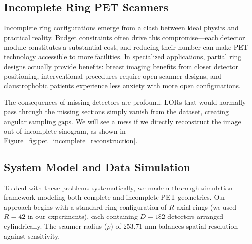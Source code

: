 \documentclass[
reprint,
superscriptaddress,
nofootinbib,
amsmath,amssymb,
aps,
prd,
]{revtex4-2}
\begin{document}
\subsection{Incomplete Ring PET Scanners}



Incomplete ring configurations emerge from a clash between ideal physics and practical reality. Budget constraints often drive this compromise—each detector module constitutes a substantial cost, and reducing their number can make PET technology accessible to more facilities. In specialized applications, partial ring designs actually provide benefits: breast imaging benefits from closer detector positioning, interventional procedures require open scanner designs, and claustrophobic patients experience less anxiety with more open configurations.





The consequences of missing detectors are profound. 
LORs that would normally pass through the missing sections simply vanish from the dataset, creating angular sampling gaps. We will see a mess if we directly reconstruct the image out of incomplete sinogram, as shown in Figure~\ref{fig:pet_incomplete_reconstruction}.

\subsection{System Model and Data Simulation}

To deal with these problems systematically, we made a thorough simulation framework modeling both complete and incomplete PET geometries. Our approach begins with a standard ring configuration of $R$ axial rings (we used $R=42$ in our experiments), each containing $D=182$ detectors arranged cylindrically. The scanner radius ($\rho$) of 253.71 mm balances spatial resolution against sensitivity.
\end{document}
